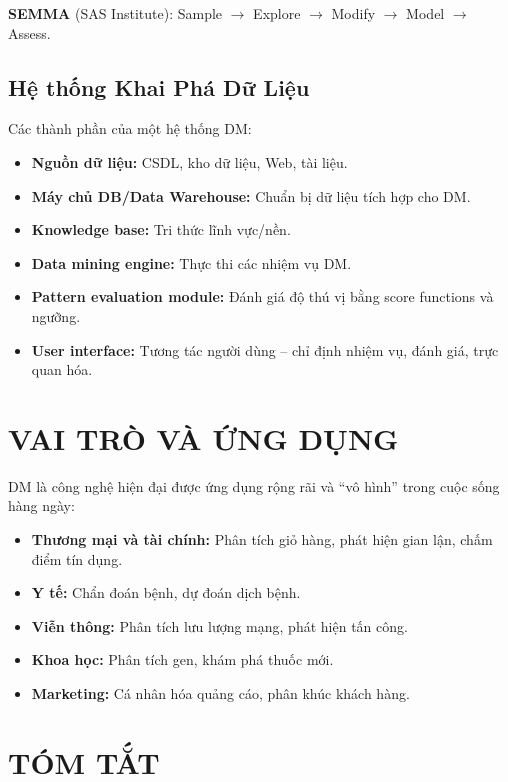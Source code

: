 \documentclass[10pt]{article}
\begin{document}
\textbf{SEMMA} (SAS Institute): Sample $\to$ Explore $\to$ Modify $\to$ Model $\to$ Assess.

\subsection{Hệ thống Khai Phá Dữ Liệu}

Các thành phần của một hệ thống DM:
\begin{itemize}
    \item \textbf{Nguồn dữ liệu:} CSDL, kho dữ liệu, Web, tài liệu.
    \item \textbf{Máy chủ DB/Data Warehouse:} Chuẩn bị dữ liệu tích hợp cho DM.
    \item \textbf{Knowledge base:} Tri thức lĩnh vực/nền.
    \item \textbf{Data mining engine:} Thực thi các nhiệm vụ DM.
    \item \textbf{Pattern evaluation module:} Đánh giá độ thú vị bằng score functions và ngưỡng.
    \item \textbf{User interface:} Tương tác người dùng -- chỉ định nhiệm vụ, đánh giá, trực quan hóa.
\end{itemize}

\section{VAI TRÒ VÀ ỨNG DỤNG}

DM là công nghệ hiện đại được ứng dụng rộng rãi và ``vô hình'' trong cuộc sống hàng ngày:
\begin{itemize}
    \item \textbf{Thương mại và tài chính:} Phân tích giỏ hàng, phát hiện gian lận, chấm điểm tín dụng.
    \item \textbf{Y tế:} Chẩn đoán bệnh, dự đoán dịch bệnh.
    \item \textbf{Viễn thông:} Phân tích lưu lượng mạng, phát hiện tấn công.
    \item \textbf{Khoa học:} Phân tích gen, khám phá thuốc mới.
    \item \textbf{Marketing:} Cá nhân hóa quảng cáo, phân khúc khách hàng.
\end{itemize}

\section{TÓM TẮT}
\end{document}
